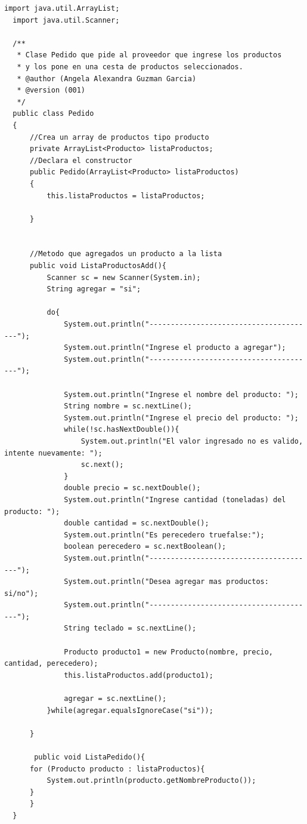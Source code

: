 \documentclass[10pt,a4paper]{article}
\def\StartLineAt#1{\lstset{firstnumber=#1}}
\begin{document}
\StartLineAt{1}
\begin{lstlisting}[style=Java]
  import java.util.ArrayList;
  import java.util.Scanner;
  
  /**
   * Clase Pedido que pide al proveedor que ingrese los productos 
   * y los pone en una cesta de productos seleccionados.
   * @author (Angela Alexandra Guzman Garcia) 
   * @version (001)
   */
  public class Pedido
  {
      //Crea un array de productos tipo producto
      private ArrayList<Producto> listaProductos;
      //Declara el constructor
      public Pedido(ArrayList<Producto> listaProductos)
      {
          this.listaProductos = listaProductos;
          
      }
      
  
      //Metodo que agregados un producto a la lista
      public void ListaProductosAdd(){
          Scanner sc = new Scanner(System.in);
          String agregar = "si";
          
          do{
              System.out.println("---------------------------------------");
              System.out.println("Ingrese el producto a agregar");
              System.out.println("---------------------------------------");
              
              System.out.println("Ingrese el nombre del producto: ");
              String nombre = sc.nextLine();
              System.out.println("Ingrese el precio del producto: ");
              while(!sc.hasNextDouble()){
                  System.out.println("El valor ingresado no es valido, intente nuevamente: ");
                  sc.next();
              }
              double precio = sc.nextDouble();
              System.out.println("Ingrese cantidad (toneladas) del producto: ");
              double cantidad = sc.nextDouble();
              System.out.println("Es perecedero truefalse:");
              boolean perecedero = sc.nextBoolean();
              System.out.println("---------------------------------------");
              System.out.println("Desea agregar mas productos: si/no");
              System.out.println("---------------------------------------");
              String teclado = sc.nextLine();
              
              Producto producto1 = new Producto(nombre, precio, cantidad, perecedero);
              this.listaProductos.add(producto1);
              
              agregar = sc.nextLine();
          }while(agregar.equalsIgnoreCase("si"));
          
      }
      
       public void ListaPedido(){
      for (Producto producto : listaProductos){
          System.out.println(producto.getNombreProducto());
      }
      }
  }
\end{lstlisting}
\end{document}
